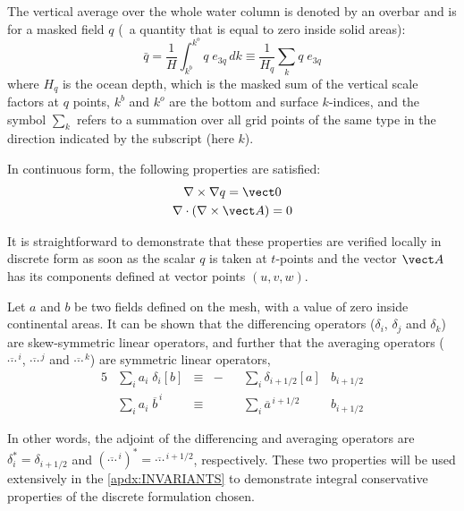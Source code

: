\documentclass[../main/NEMO_manual]{subfiles}
\begin{document}
The vertical average over the whole water column is denoted by an overbar and
is for a masked field $q$ (\ie\ a quantity that is equal to zero inside solid areas):
\begin{equation}
  \label{eq:DOM_bar}
  \bar q = \frac{1}{H} \int_{k^b}^{k^o} q \; e_{3q} \, dk \equiv \frac{1}{H_q} \sum \limits_k q \; e_{3q}
\end{equation}
where $H_q$  is the ocean depth, which is the masked sum of the vertical scale factors at $q$ points,
$k^b$ and $k^o$ are the bottom and surface $k$-indices,
and the symbol $\sum \limits_k$ refers to a summation over all grid points of the same type in
the direction indicated by the subscript (here $k$).

In continuous form, the following properties are satisfied:
\begin{gather}
  \label{eq:DOM_curl_grad}
  \nabla \times \nabla q = \vect 0 \\
  \label{eq:DOM_div_curl}
  \nabla \cdot (\nabla \times \vect A) = 0
\end{gather}

It is straightforward to demonstrate that these properties are verified locally in discrete form as
soon as the scalar $q$ is taken at $t$-points and the vector $\vect A$ has its components defined at
vector points $(u,v,w)$.

Let $a$ and $b$ be two fields defined on the mesh, with a value of zero inside continental areas.
It can be shown that the differencing operators ($\delta_i$, $\delta_j$ and
$\delta_k$) are skew-symmetric linear operators,
and further that the averaging operators ($\overline{\cdots}^{\, i}$, $\overline{\cdots}^{\, j}$ and
$\overline{\cdots}^{\, k}$) are symmetric linear operators, \ie
\begin{alignat}{5}
  \label{eq:DOM_di_adj}
  &\sum \limits_i a_i \; \delta_i [b]      &\equiv &- &&\sum \limits_i \delta      _{   i + 1/2} [a] &b_{i + 1/2} \\
  \label{eq:DOM_mi_adj}
  &\sum \limits_i a_i \; \overline b^{\, i} &\equiv &  &&\sum \limits_i \overline a ^{\, i + 1/2}     &b_{i + 1/2}
\end{alignat}

In other words,
the adjoint of the differencing and averaging operators are $\delta_i^* = \delta_{i + 1/2}$ and
$(\overline{\cdots}^{\, i})^* = \overline{\cdots}^{\, i + 1/2}$, respectively.
These two properties will be used extensively in the \autoref{apdx:INVARIANTS} to
demonstrate integral conservative properties of the discrete formulation chosen.
\end{document}
